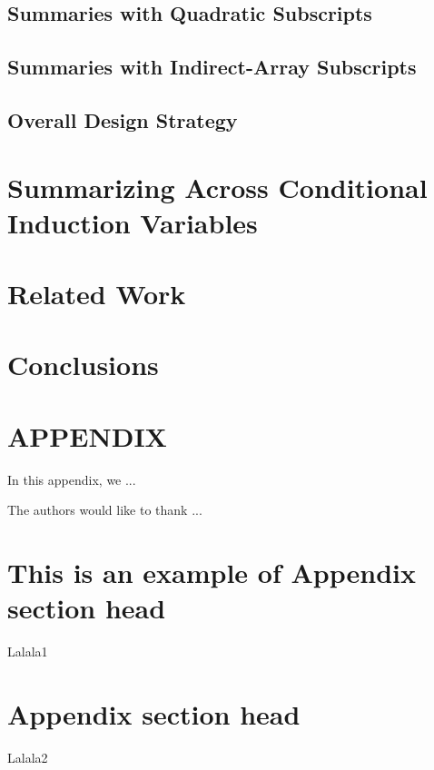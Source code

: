 \documentclass[prodmode,acmtecs]{acmsmall}
\begin{document}
\subsection{Summaries with Quadratic Subscripts}

\subsection{Summaries with Indirect-Array Subscripts}

\subsection{Overall Design Strategy}


\section{Summarizing Across Conditional Induction Variables}

\section{Related Work}


\section{Conclusions}



\appendix
\section*{APPENDIX}
\setcounter{section}{1}
In this appendix, we ...


\begin{acks}
The authors would like to thank ...
\end{acks}





\elecappendix

\medskip

\section{This is an example of Appendix section head}

Lalala1


\section{Appendix section head}

Lalala2
\end{document}
